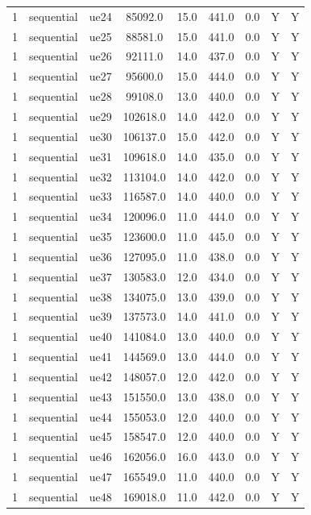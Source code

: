 \begin{table}[ht]
\begin{tabular}{|c|c|c|c|c|c|c|c|c|}
1 & sequential & ue24 & 85092.0 & 15.0 & 441.0 & 0.0 & Y & Y \\
1 & sequential & ue25 & 88581.0 & 15.0 & 441.0 & 0.0 & Y & Y \\
1 & sequential & ue26 & 92111.0 & 14.0 & 437.0 & 0.0 & Y & Y \\
1 & sequential & ue27 & 95600.0 & 15.0 & 444.0 & 0.0 & Y & Y \\
1 & sequential & ue28 & 99108.0 & 13.0 & 440.0 & 0.0 & Y & Y \\
1 & sequential & ue29 & 102618.0 & 14.0 & 442.0 & 0.0 & Y & Y \\
1 & sequential & ue30 & 106137.0 & 15.0 & 442.0 & 0.0 & Y & Y \\
1 & sequential & ue31 & 109618.0 & 14.0 & 435.0 & 0.0 & Y & Y \\
1 & sequential & ue32 & 113104.0 & 14.0 & 442.0 & 0.0 & Y & Y \\
1 & sequential & ue33 & 116587.0 & 14.0 & 440.0 & 0.0 & Y & Y \\
1 & sequential & ue34 & 120096.0 & 11.0 & 444.0 & 0.0 & Y & Y \\
1 & sequential & ue35 & 123600.0 & 11.0 & 445.0 & 0.0 & Y & Y \\
1 & sequential & ue36 & 127095.0 & 11.0 & 438.0 & 0.0 & Y & Y \\
1 & sequential & ue37 & 130583.0 & 12.0 & 434.0 & 0.0 & Y & Y \\
1 & sequential & ue38 & 134075.0 & 13.0 & 439.0 & 0.0 & Y & Y \\
1 & sequential & ue39 & 137573.0 & 14.0 & 441.0 & 0.0 & Y & Y \\
1 & sequential & ue40 & 141084.0 & 13.0 & 440.0 & 0.0 & Y & Y \\
1 & sequential & ue41 & 144569.0 & 13.0 & 444.0 & 0.0 & Y & Y \\
1 & sequential & ue42 & 148057.0 & 12.0 & 442.0 & 0.0 & Y & Y \\
1 & sequential & ue43 & 151550.0 & 13.0 & 438.0 & 0.0 & Y & Y \\
1 & sequential & ue44 & 155053.0 & 12.0 & 440.0 & 0.0 & Y & Y \\
1 & sequential & ue45 & 158547.0 & 12.0 & 440.0 & 0.0 & Y & Y \\
1 & sequential & ue46 & 162056.0 & 16.0 & 443.0 & 0.0 & Y & Y \\
1 & sequential & ue47 & 165549.0 & 11.0 & 440.0 & 0.0 & Y & Y \\
1 & sequential & ue48 & 169018.0 & 11.0 & 442.0 & 0.0 & Y & Y \\

\end{tabular}
\end{table}
